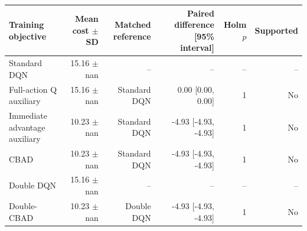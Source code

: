 \begin{tabular}{lrrrrr}
\toprule
Training objective & Mean cost $\pm$ SD & Matched reference & Paired difference [95\% interval] & Holm $p$ & Supported \\
\midrule
Standard DQN & 15.16 $\pm$ nan & -- & -- & -- & -- \\
Full-action Q auxiliary & 15.16 $\pm$ nan & Standard DQN & 0.00 [0.00, 0.00] & 1 & No \\
Immediate advantage auxiliary & 10.23 $\pm$ nan & Standard DQN & -4.93 [-4.93, -4.93] & 1 & No \\
CBAD & 10.23 $\pm$ nan & Standard DQN & -4.93 [-4.93, -4.93] & 1 & No \\
Double DQN & 15.16 $\pm$ nan & -- & -- & -- & -- \\
Double-CBAD & 10.23 $\pm$ nan & Double DQN & -4.93 [-4.93, -4.93] & 1 & No \\
\bottomrule
\end{tabular}